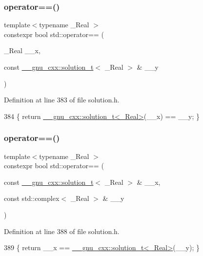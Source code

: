 \subsubsection{\texorpdfstring{operator==()}{operator==()}\hspace{0.1cm}{\footnotesize\ttfamily [3/5]}}
{\footnotesize\ttfamily template$<$typename \+\_\+\+Real $>$ \\
constexpr bool std\+::operator== (\begin{DoxyParamCaption}\item[{\+\_\+\+Real}]{\+\_\+\+\_\+x,  }\item[{const \hyperlink{namespace____gnu__cxx_ae20ea642de50eb361074c62676b0159c}{\+\_\+\+\_\+gnu\+\_\+cxx\+::solution\+\_\+t}$<$ \+\_\+\+Real $>$ \&}]{\+\_\+\+\_\+y }\end{DoxyParamCaption})}



Definition at line 383 of file solution.\+h.


\begin{DoxyCode}
384     \{ \textcolor{keywordflow}{return} \hyperlink{namespace____gnu__cxx_ae20ea642de50eb361074c62676b0159c}{\_\_gnu\_cxx::solution\_t<\_Real>}(\_\_x) == \_\_y; \}
\end{DoxyCode}
\mbox{\label{namespacestd_a7c9ad0c2dd7b387d13d1c5efead8a864}} 
\subsubsection{\texorpdfstring{operator==()}{operator==()}\hspace{0.1cm}{\footnotesize\ttfamily [4/5]}}
{\footnotesize\ttfamily template$<$typename \+\_\+\+Real $>$ \\
constexpr bool std\+::operator== (\begin{DoxyParamCaption}\item[{const \hyperlink{namespace____gnu__cxx_ae20ea642de50eb361074c62676b0159c}{\+\_\+\+\_\+gnu\+\_\+cxx\+::solution\+\_\+t}$<$ \+\_\+\+Real $>$ \&}]{\+\_\+\+\_\+x,  }\item[{const std\+::complex$<$ \+\_\+\+Real $>$ \&}]{\+\_\+\+\_\+y }\end{DoxyParamCaption})}



Definition at line 388 of file solution.\+h.


\begin{DoxyCode}
389     \{ \textcolor{keywordflow}{return} \_\_x == \hyperlink{namespace____gnu__cxx_ae20ea642de50eb361074c62676b0159c}{\_\_gnu\_cxx::solution\_t<\_Real>}(\_\_y); \}
\end{DoxyCode}
\mbox{\label{namespacestd_a79924b566476ed02b0e085744a838d4c}} 
